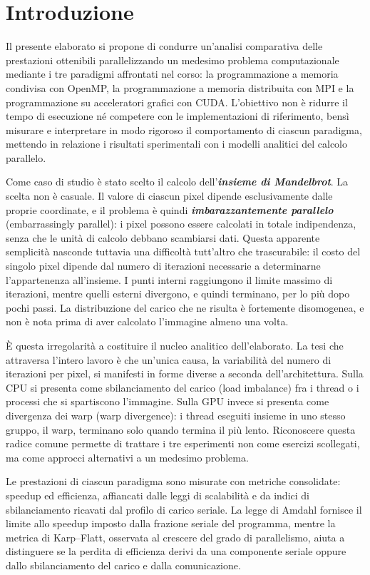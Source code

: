 \section{Introduzione}

Il presente elaborato si propone di condurre un'analisi comparativa delle prestazioni ottenibili parallelizzando un medesimo problema computazionale mediante i tre paradigmi affrontati nel corso: la programmazione a memoria condivisa con OpenMP, la programmazione a memoria distribuita con MPI e la programmazione su acceleratori grafici con CUDA.
L'obiettivo non è ridurre il tempo di esecuzione né competere con le implementazioni di riferimento,
bensì misurare e interpretare in modo rigoroso il comportamento di ciascun paradigma,
mettendo in relazione i risultati sperimentali con i modelli analitici del calcolo parallelo.

Come caso di studio è stato scelto il calcolo dell'\textit{\textbf{insieme di Mandelbrot}}. La scelta non è casuale.
Il valore di ciascun pixel dipende esclusivamente dalle proprie coordinate, e il problema è quindi \textit{\textbf{imbarazzantemente parallelo}} (embarrassingly parallel):
i pixel possono essere calcolati in totale indipendenza, senza che le unità di calcolo debbano scambiarsi dati.
Questa apparente semplicità nasconde tuttavia una difficoltà tutt'altro che trascurabile: il costo del singolo pixel dipende dal
numero di iterazioni necessarie a determinarne l'appartenenza all'insieme.
I punti interni raggiungono il limite massimo di iterazioni, mentre quelli esterni divergono, e quindi terminano, per lo più dopo pochi passi.
La distribuzione del carico che ne risulta è fortemente disomogenea, e non è nota prima di aver calcolato l'immagine almeno una volta.

È questa irregolarità a costituire il nucleo analitico dell'elaborato. La tesi che attraversa l'intero lavoro
è che un'unica causa, la variabilità del numero di iterazioni per pixel, si manifesti in forme diverse a seconda dell'architettura.
Sulla CPU si presenta come sbilanciamento del carico (load imbalance) fra i thread o i processi che si spartiscono l'immagine.
Sulla GPU invece si presenta come divergenza dei warp (warp divergence): i thread eseguiti insieme in uno stesso gruppo, il warp, terminano solo quando termina il più lento.
Riconoscere questa radice comune permette di trattare i tre esperimenti non come esercizi scollegati, ma come approcci alternativi a un medesimo problema.

Le prestazioni di ciascun paradigma sono misurate con metriche consolidate: speedup ed efficienza,
affiancati dalle leggi di scalabilità e da indici di sbilanciamento ricavati dal profilo di carico seriale.
La legge di Amdahl fornisce il limite allo speedup imposto dalla frazione seriale del programma, mentre la metrica di Karp–Flatt,
osservata al crescere del grado di parallelismo, aiuta a distinguere se la perdita di efficienza derivi da una componente
seriale oppure dallo sbilanciamento del carico e dalla comunicazione.

